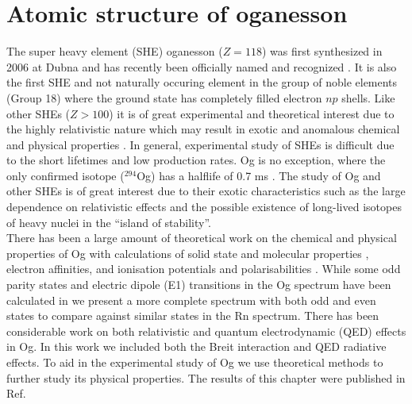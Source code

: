 \documentclass[10pt,a4paper, twoside, openright]{report}
\begin{document}
 \chapter{Atomic structure of oganesson} \label{chap:Og}
The super heavy element (SHE) oganesson ($Z=118$) was first synthesized in 2006 at Dubna \cite{OganessianOg2006} and has recently been officially named and recognized \cite{Karol2016}.  It is also the first SHE and not naturally occuring element in the group of noble elements (Group 18) where the ground state has completely filled electron $np$ shells. Like other SHEs  ($Z>100$) it is of great experimental and theoretical interest due to the highly relativistic nature  which may result in exotic and anomalous chemical and physical properties \cite{Pershina2009, Schwerdtfeger2014}. In general, experimental study of SHEs is difficult  due to the short lifetimes and low production rates. Og is no exception, where the only confirmed isotope ($^{294}$Og) has a halflife of 0.7 ms \cite{OganessianOg2006}. The study of Og and other SHEs is of great interest due to their exotic characteristics such as the large dependence on relativistic effects and the possible existence of long-lived isotopes of heavy nuclei in the ``island of stability''. \\
\linebreak
 There has been a large amount of  theoretical work on the chemical and physical properties of Og with calculations of solid state and molecular properties \cite{Kullie2012, Shee2015, Nash1999, Nash2005, Peter2016}, electron affinities\cite{Pitzer1975, EliavOg1996, PershinaOg2008, Hangele2012, Goidenko2003}, and ionisation potentials and polarisabilities \cite{PershinaOg2008, Desclaux1973, Nash2005, Jerabek2018}. While some odd parity states and electric dipole (E1) transitions in the Og spectrum have been calculated in \cite{Indelicato2007} we present a more complete spectrum with both odd and even states to compare against similar states in the Rn spectrum. There has been considerable work on both relativistic and quantum electrodynamic (QED) effects \cite{Pyykko1988, Jerabek2018, Goidenko2003, Eliav2015, Indelicato2007, Thierfelder2010} in Og. In this work we included both the Breit interaction and QED radiative effects. To aid in the experimental study of Og we use  theoretical methods to further study its physical properties.  The results of this chapter were published in Ref. \cite{LDFOg2018}
\end{document}
